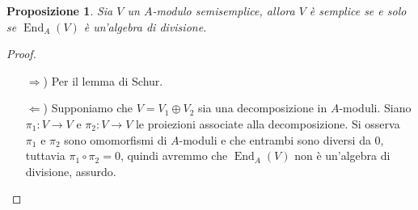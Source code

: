 \documentclass[11pt]{article}
\theoremstyle{plain}
\newtheorem{prop}[thm]{Proposizione}
\theoremstyle{definition}
\theoremstyle{remark}
\DeclareMathOperator{\End}{End}
\begin{document}
	\begin{prop}
		Sia $V$ un $A$-modulo semisemplice, allora $V$ è semplice se e solo se $\End_A(V)$ è un'algebra di divisione.
	\end{prop}
	\begin{proof}
		\begin{enumerate}
			\item[$\Rightarrow$)]Per il lemma di Schur.
			\item[$\Leftarrow$)]Supponiamo che $V=V_1\oplus V_2$ sia una decomposizione in $A$-moduli. Siano $\pi_1:V\to V$ e $\pi_2:V\to V$ le proiezioni associate alla decomposizione. Si osserva $\pi_1$ e $\pi_2$ sono omomorfismi di $A$-moduli e che entrambi sono diversi da $0$, tuttavia $\pi_1\circ \pi_2 = 0$, quindi avremmo che $\End_A(V)$ non è un'algebra di divisione, assurdo.
		\end{enumerate}
	\end{proof}
\end{document}
